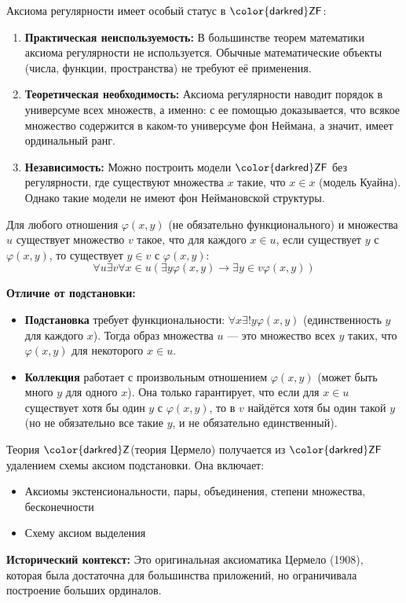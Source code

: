\documentclass[11pt, a4paper]{extarticle}
\newcommand{\ph}{\varphi}
\newcommand{\ZF}{\ifmmode \mathsf{\color{darkred}ZF}\else ${\mathsf{\color{darkred}ZF}}$\fi\xspace}
\newcommand{\Zermelo}{\ifmmode \mathsf{\color{darkred}Z}\else ${\mathsf{\color{darkred}Z}}$\fi\xspace}
\begin{document}
\begin{theorem}
Аксиома регулярности имеет особый статус в \ZF:
\begin{enumerate}
    \item \textbf{Практическая неиспользуемость:} В большинстве теорем математики аксиома регулярности не используется. Обычные математические объекты (числа, функции, пространства) не требуют её применения.
    
    \item \textbf{Теоретическая необходимость:} Аксиома регулярности
    наводит порядок в универсуме всех множеств, а именно: с ее помощью доказывается, что всякое множество содержится в каком-то универсуме фон Неймана, а значит, имеет ординальный ранг.

    \item \textbf{Независимость:} Можно построить модели \ZF без регулярности, где существуют множества $x$ такие, что $x \in x$ (модель Куайна). Однако такие модели не имеют фон Неймановской структуры.
\end{enumerate}
\end{theorem}

\begin{definition}
Для любого отношения $\ph(x, y)$ (не обязательно функционального) и множества $u$ существует множество $v$ такое, что для каждого $x \in u$, если существует $y$ с $\ph(x, y)$, то существует $y \in v$ с $\ph(x, y)$:
$$\forall u \exists v \forall x \in u (\exists y \ph(x,y) \rightarrow \exists y \in v \ph(x,y))$$

\textbf{Отличие от подстановки:} 
\begin{itemize}
    \item \textbf{Подстановка} требует функциональности: $\forall x \exists! y \ph(x,y)$ (единственность $y$ для каждого $x$). Тогда образ множества $u$ --- это множество всех $y$ таких, что $\ph(x,y)$ для некоторого $x \in u$.
    \item \textbf{Коллекция} работает с произвольным отношением $\ph(x,y)$ (может быть много $y$ для одного $x$). Она только гарантирует, что если для $x \in u$ существует хотя бы один $y$ с $\ph(x,y)$, то в $v$ найдётся хотя бы один такой $y$ (но не обязательно все такие $y$, и не обязательно единственный).
\end{itemize}
\end{definition}


\begin{definition}[Теория \Zermelo (теория Цермело)]
Теория \Zermelo (теория Цермело) получается из \ZF удалением схемы аксиом подстановки. Она включает:
\begin{itemize}
    \item Аксиомы экстенсиональности, пары, объединения, степени множества, бесконечности
    \item Схему аксиом выделения
\end{itemize}
\textbf{Исторический контекст:} Это оригинальная аксиоматика Цермело (1908), которая была достаточна для большинства приложений, но ограничивала построение больших ординалов.
\end{definition}
\end{document}
